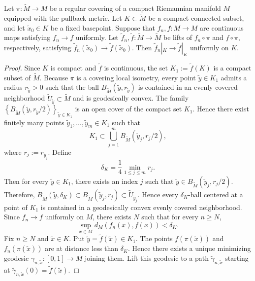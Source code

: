 \documentclass[10pt,a4paper]{amsart}
\begin{document}
	\begin{lemma}
		\label{lem:stability_lifts}
		Let $\pi:\widetilde{M}\to M$ be a regular covering of a compact Riemannian
		manifold $M$ equipped with the pullback metric. Let $K\subset\widetilde M$ be a
		compact connected subset, and let $\tilde{x}_0\in K$ be a fixed basepoint.
		Suppose that $f_n,f:M\to M$ are continuous maps satisfying $f_n\to f$ uniformly.
		Let $\widetilde f_n,\widetilde f:\widetilde M\to\widetilde M$ be lifts of
		$f_n\circ\pi$ and $f\circ\pi$, respectively, satisfying $\widetilde
		f_n(\tilde{x}_0)\longrightarrow \widetilde f(\tilde{x}_0).$ Then $\widetilde
		f_n|_K\longrightarrow \widetilde f|_K$ uniformly on $K$.
	\end{lemma}

	\begin{proof}
		Since $K$ is compact and $\widetilde f$ is continuous, the set $K_1:=\widetilde
		f(K)$ is a compact subset of $\widetilde M$. Because $\pi$ is a covering local
		isometry, every point $\tilde y\in K_1$ admits a radius $r_{\tilde y}>0$ such
		that the ball $B_{\widetilde M}(\tilde y,r_{\tilde y})$ is contained in an
		evenly covered neighborhood $\widetilde U_{\tilde y}\subset\widetilde M$ and is
		geodesically convex. The family $\left\{ B_{\widetilde M}(\tilde y,r_{\tilde
			y}/2) \right\}_{\tilde y\in K_1}$ is an open cover of the compact set $K_1$.
		Hence there exist finitely many points $\tilde y_1,\ldots,\tilde y_m\in K_1$
		such that
		\[
		K_1\subset \bigcup_{j=1}^{m} B_{\widetilde M} (\tilde y_j,r_j/2),
		\]
		where $r_j:=r_{\tilde y_j}.$ Define
		\[
		\delta_K = \frac14\min_{1\le j\le m}r_j.
		\]
		Then for every $\tilde y\in K_1$, there exists an index $j$ such that $\tilde
		y\in B_{\widetilde M}(\tilde y_j,r_j/2).$ Therefore, $B_{\widetilde M}(\tilde
		y,\delta_K) \subset B_{\widetilde M}(\tilde y_j,r_j) \subset \widetilde
		U_{\tilde y_j}.$ Hence every $\delta_K$-ball centered at a point of $K_1$ is
		contained in a geodesically convex evenly covered neighborhood. Since $f_n\longrightarrow
		f$ uniformly on $M$, there exists $N$ such that for every $n\ge N$,
		\[
		\sup_{x\in M} d_M(f_n(x),f(x)) < \delta_K.
		\]
		Fix $n\ge N$ and $\tilde x\in K$. Put $\tilde y=\widetilde f(\tilde x)\in K_1.$
		The points $f(\pi(\tilde x))$ and $f_n(\pi(\tilde x))$ are at distance less than
		$\delta_K$. Hence there exists a unique minimizing geodesic $\gamma_{n,\tilde
			x}:[0,1]\to M$ joining them. Lift this geodesic to a path $\widetilde\gamma_{n,\tilde
			x}$ starting at $\widetilde\gamma_{n,\tilde x}(0) = \widetilde f(\tilde x).$

\end{proof}
\end{document}
